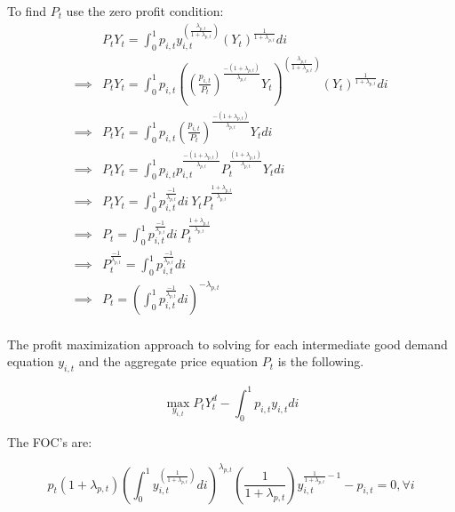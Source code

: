 To find $P_{t}$ use the zero profit condition:
\begin{equation}
\begin{split}
& P_{t}Y_{t} = \int_{0}^{1}p_{i,t}y_{i,t}^{\left(\frac{\lambda_{p,t}}{1+\lambda_{p,t}}\right)}(Y_{t})^{\frac{1}{1+\lambda_{p,t}}}di \\
\implies & P_{t}Y_{t} = \int_{0}^{1}p_{i,t}\left(\left(\frac{p_{i,t}}{P_{t}}\right)^{\frac{-(1+\lambda_{p,t})}{\lambda_{p,t}}}Y_{t}\right)^{\left(\frac{\lambda_{p,t}}{1+\lambda_{p,t}}\right)}(Y_{t})^{\frac{1}{1+\lambda_{p,t}}}di \\
\implies & P_{t}Y_{t} = \int_{0}^{1}p_{i,t}\left(\frac{p_{i,t}}{P_{t}}\right)^{\frac{-(1+\lambda_{p,t})}{\lambda_{p,t}}}Y_{t}di \\
\implies & P_{t}Y_{t} = \int_{0}^{1}p_{i,t}p_{i,t}^{\frac{-(1+\lambda_{p,t})}{\lambda_{p,t}}}P_{t}^{\frac{(1+\lambda_{p,t})}{\lambda_{p,t}}}Y_{t}di \\
\implies & P_{t}Y_{t} = \int_{0}^{1}p_{i,t}^{\frac{-1}{\lambda_{p,t}}}di \:  Y_{t}P_{t}^{\frac{1+\lambda_{p,t}}{\lambda_{p,t}}} \\
\implies & P_{t} = \int_{0}^{1}p_{i,t}^{\frac{-1}{\lambda_{p,t}}}di \: P_{t}^{\frac{1+\lambda_{p,t}}{\lambda_{p,t}}} \\
\implies & P_{t}^{\frac{-1}{\lambda_{p,t}}} = \int_{0}^{1}p_{i,t}^{\frac{-1}{\lambda_{p,t}}}di \\
\implies & P_{t} = \left(\int_{0}^{1}p_{i,t}^{\frac{-1}{\lambda_{p,t}}}di\right)^{-\lambda_{p,t}} \\
\end{split}
\end{equation}



The profit maximization approach to solving for each intermediate good demand equation $y_{i,t}$ and the aggregate price equation $P_t$ is the following.

\begin{equation}
\max_{y_{i,t}} P_{t}Y_{t}^{d} - \int_{0}^{1}p_{i,t}y_{i,t}di
\end{equation}

The FOC's are:

\begin{equation}
p_{t}(1+\lambda_{p,t})\left(\int_{0}^{1}y_{i,t}^{\left(\frac{1}{1+\lambda_{p,t}}\right)}di\right)^{\lambda_{p,t}}\left(\frac{1}{1+\lambda_{p,t}}\right)y_{i,t}^{\frac{1}{1+\lambda_{p,t}}-1}-p_{i,t} = 0, \forall i
\end{equation}

